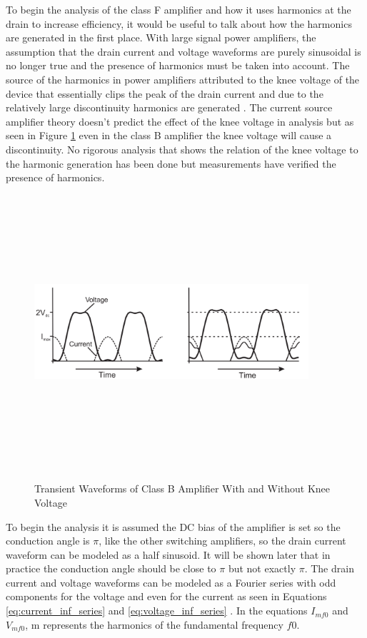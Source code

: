 To begin the analysis of the class F amplifier and how it uses harmonics at the drain to increase efficiency, it would be useful to talk about how the harmonics are generated in the first place. With large signal power amplifiers, the assumption that the drain current and voltage waveforms are purely sinusoidal is no longer true and the presence of harmonics must be taken into account. The source of the harmonics in power amplifiers attributed to the knee voltage of the device that essentially clips the peak of the drain current and due to the relatively large discontinuity harmonics are generated \cite{Colantonio1998}. The current source amplifier theory doesn't predict the effect of the knee voltage in analysis but as seen in Figure \ref{fig:knee_harmonics} even in the class B amplifier the knee voltage will cause a discontinuity. No rigorous analysis that shows the relation of the knee voltage to the harmonic generation has been done but measurements have verified the presence of harmonics.
\begin{figure}
  \centering
  \includegraphics[width=4in,height=4in,keepaspectratio]{figures/detail/knee_harmonics}\\
  \caption{Transient Waveforms of Class B Amplifier With and Without Knee Voltage \cite{C.Cripps2006}}
  \label{fig:knee_harmonics}
\end{figure}

To begin the analysis it is assumed the DC bias of the amplifier is set so the conduction angle is $\pi$, like the other switching amplifiers, so the drain current waveform can be modeled as a half sinusoid. It will be shown later that in practice the conduction angle should be close to $\pi$ but not exactly $\pi$. The drain current and voltage waveforms can be modeled as a Fourier series with odd components for the voltage and even for the current as seen in Equations \ref{eq:current_inf_series} and \ref{eq:voltage_inf_series} \cite{Raab1997}. In the equations $I_{mf0}$ and $V_{mf0}$, m represents the harmonics of the fundamental frequency $f0$.

